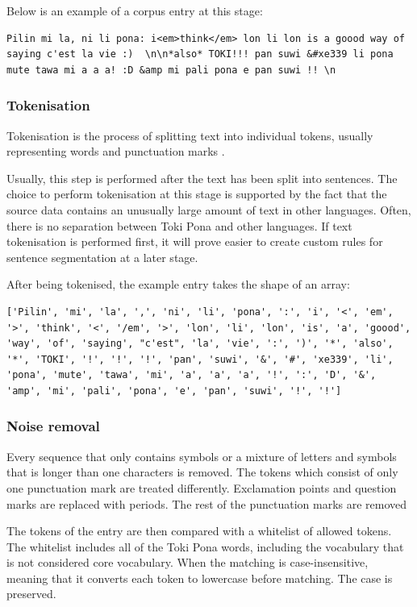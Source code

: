 \documentclass[14pt, a4paper]{extreport}
\begin{document}
Below is an example of a corpus entry at this stage:

\begin{lstlisting}
Pilin mi la, ni li pona: i<em>think</em> lon li lon is a goood way of saying c'est la vie :)  \n\n*also* TOKI!!! pan suwi &#xe339 li pona mute tawa mi a a a! :D &amp mi pali pona e pan suwi !! \n
\end{lstlisting}
      \subsubsection{Tokenisation}
Tokenisation is the process of splitting text into individual tokens, usually representing words and punctuation marks \parencite[49]{vajjala}.

Usually, this step is performed after the text has been split into sentences. The choice to perform tokenisation at this stage is supported by the fact that the source data contains an unusually large amount of text in other languages. Often, there is no separation between Toki Pona and other languages. If text tokenisation is performed first, it will prove easier to create custom rules for sentence segmentation at a later stage.

After being tokenised, the example entry takes the shape of an array:

\begin{lstlisting}
['Pilin', 'mi', 'la', ',', 'ni', 'li', 'pona', ':', 'i', '<', 'em', '>', 'think', '<', '/em', '>', 'lon', 'li', 'lon', 'is', 'a', 'goood', 'way', 'of', 'saying', "c'est", 'la', 'vie', ':', ')', '*', 'also', '*', 'TOKI', '!', '!', '!', 'pan', 'suwi', '&', '#', 'xe339', 'li', 'pona', 'mute', 'tawa', 'mi', 'a', 'a', 'a', '!', ':', 'D', '&', 'amp', 'mi', 'pali', 'pona', 'e', 'pan', 'suwi', '!', '!']
\end{lstlisting}
      \subsubsection{Noise removal}
Every sequence that only contains symbols or a mixture of letters and symbols that is longer than one characters is removed. The tokens which consist of only one punctuation mark are treated differently. Exclamation points and question marks are replaced with periods. The rest of the punctuation marks are removed

The tokens of the entry are then compared with a whitelist of allowed tokens. The whitelist includes all of the Toki Pona words, including the vocabulary that is not considered core vocabulary. When the matching is case-insensitive, meaning that it converts each token to lowercase before matching. The case is preserved.
\end{document}
